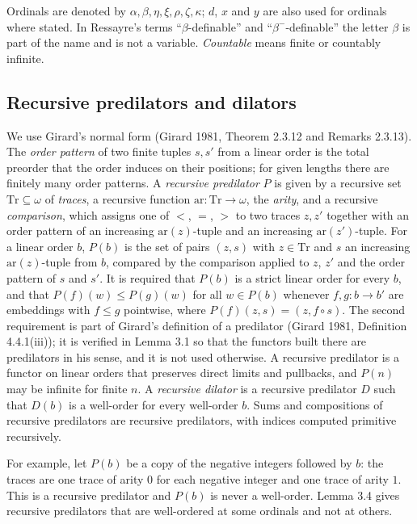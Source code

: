 \documentclass[11pt]{article}
\begin{document}
Ordinals are denoted by $\alpha, \beta, \eta, \xi, \rho, \zeta, \kappa$; $d$, $x$ and $y$ are also used for ordinals
where stated. In Ressayre's terms ``$\beta$-definable'' and ``$\beta^-$-definable'' the letter $\beta$ is part of the
name and is not a variable. \emph{Countable} means finite or countably infinite.

\subsection{Recursive predilators and dilators}

We use Girard's normal form (Girard 1981, Theorem 2.3.12 and Remarks 2.3.13). The \emph{order pattern} of two finite tuples $s, s'$ from a
linear order is the total preorder that the order induces on their positions; for given lengths there are finitely
many order patterns. A \emph{recursive predilator} $P$ is given by a recursive set $\mathrm{Tr} \subseteq \omega$ of
\emph{traces}, a recursive function $\mathrm{ar} : \mathrm{Tr} \to \omega$, the \emph{arity}, and a recursive
\emph{comparison}, which assigns one of $<$, $=$, $>$ to two traces $z, z'$ together with an order pattern of an
increasing $\mathrm{ar}(z)$-tuple and an increasing $\mathrm{ar}(z')$-tuple. For a linear order $b$, $P(b)$ is the
set of pairs $(z, s)$ with $z \in \mathrm{Tr}$ and $s$ an increasing $\mathrm{ar}(z)$-tuple from $b$, compared by the
comparison applied to $z$, $z'$ and the order pattern of $s$ and $s'$. It is required that $P(b)$ is a strict linear
order for every $b$, and that $P(f)(w) \le P(g)(w)$ for all $w \in P(b)$ whenever $f, g : b \to b'$ are embeddings
with $f \le g$ pointwise, where $P(f)(z, s) = (z, f \circ s)$. The second requirement is part of Girard's
definition of a predilator (Girard 1981, Definition 4.4.1(iii)); it is verified in Lemma 3.1 so that the functors built there are predilators in his sense, and it is
not used otherwise. A recursive predilator is a functor on linear orders that preserves direct limits and
pullbacks, and $P(n)$ may be infinite for finite $n$. A \emph{recursive dilator} is a recursive predilator $D$ such
that $D(b)$ is a well-order for every well-order $b$. Sums and compositions of recursive predilators are recursive
predilators, with indices computed primitive recursively.

For example, let $P(b)$ be a copy of the negative integers followed by $b$: the traces are one trace of arity $0$
for each negative integer and one trace of arity $1$. This is a recursive predilator and $P(b)$ is never a
well-order. Lemma 3.4 gives recursive predilators that are well-ordered at some ordinals and not at others.
\end{document}
